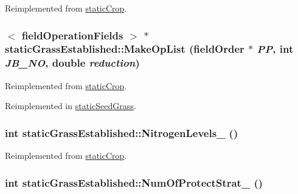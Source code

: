 Reimplemented from \hyperlink{classstatic_crop_ac8b14325e2ab05247e9b61e3af331f24}{staticCrop}.\hypertarget{classstatic_grass_established_a65912caac93f0e92f34542f28585c5ce}{
\subsubsection[{MakeOpList}]{$<$ {\bf fieldOperationFields} $>$ $\ast$ staticGrassEstablished::MakeOpList ({\bf fieldOrder} $\ast$ {\em PP}, \/  int {\em JB\_\-NO}, \/  double {\em reduction})}}
\label{classstatic_grass_established_a65912caac93f0e92f34542f28585c5ce}


Reimplemented from \hyperlink{classstatic_crop_a9b67ef1ae531a3afb32b63a4aeb5916b}{staticCrop}.

Reimplemented in \hyperlink{classstatic_seed_grass_a33e78ba847a76de09f30b7eb4ff88a68}{staticSeedGrass}.\hypertarget{classstatic_grass_established_a958b6f586cb695976b5ed8c07ad82459}{
\subsubsection[{NitrogenLevels\_\-}]{\setlength{\rightskip}{0pt plus 5cm}int staticGrassEstablished::NitrogenLevels\_\- ()}}
\label{classstatic_grass_established_a958b6f586cb695976b5ed8c07ad82459}


Reimplemented from \hyperlink{classstatic_crop_a32b69ed138beaed150efa74d18e82d8e}{staticCrop}.\hypertarget{classstatic_grass_established_ac1096e7e84a6224a87d127949c25b163}{
\subsubsection[{NumOfProtectStrat\_\-}]{\setlength{\rightskip}{0pt plus 5cm}int staticGrassEstablished::NumOfProtectStrat\_\- ()}}
\label{classstatic_grass_established_ac1096e7e84a6224a87d127949c25b163}


